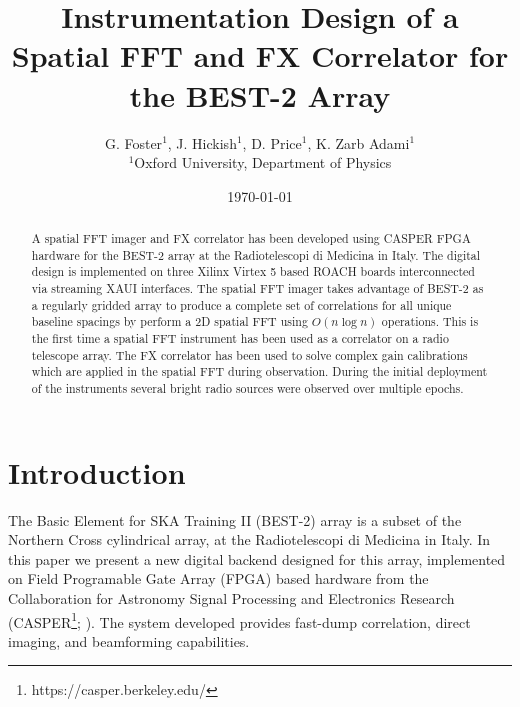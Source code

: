\documentclass[useAMS,macros,usenatbib]{mn2e}
\title[]{Instrumentation Design of a Spatial FFT and FX Correlator for the BEST-2 Array}
\author[G. Foster, J. Hickish, D. Price and K. Zarb Adami]{G. Foster$^{1}$, J. Hickish$^{1}$, D. Price$^{1}$, K. Zarb Adami$^{1}$\\
$^{1}$Oxford University, Department of Physics}
\begin{document}
\date{\today}

\pagerange{\pageref{firstpage}--\pageref{lastpage}} 

\maketitle

\begin{abstract}
A spatial FFT imager and FX correlator has been developed using CASPER FPGA hardware for the BEST-2 array at the Radiotelescopi di Medicina in Italy.
The digital design is implemented on three Xilinx Virtex 5 based ROACH boards interconnected via streaming XAUI interfaces.
The spatial FFT imager takes advantage of BEST-2 as a regularly gridded array to produce a complete set of correlations for all unique baseline spacings by perform a 2D spatial FFT using $O(n \log n)$ operations.
This is the first time a spatial FFT instrument has been used as a correlator on a radio telescope array.
The FX correlator has been used to solve complex gain calibrations which are applied in the spatial FFT during observation.
During the initial deployment of the instruments several bright radio sources were observed over multiple epochs.
\end{abstract}

\section{Introduction}

The Basic Element for SKA Training II (BEST-2) array is a subset of the Northern Cross cylindrical array, at the Radiotelescopi di Medicina in Italy.
In this paper we present a new digital backend designed for this array, implemented on Field Programable Gate Array (FPGA) based hardware from the Collaboration for Astronomy Signal Processing and Electronics Research (CASPER\footnote{https://casper.berkeley.edu/}; \cite{casper}).
The system developed provides fast-dump correlation, direct imaging, and beamforming capabilities.
\end{document}
